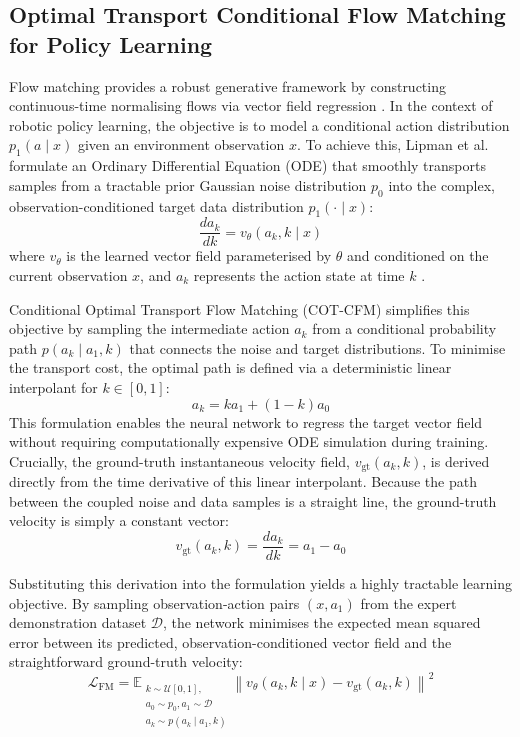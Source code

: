 \documentclass[journal]{IEEEtran}
\begin{document}
\subsection{Optimal Transport Conditional Flow Matching for Policy Learning} \label{sec:ot_cfm}

Flow matching provides a robust generative framework by constructing continuous-time normalising flows via vector field regression \cite{lipman2022flow}. In the context of robotic policy learning, the objective is to model a conditional action distribution $p_1(a \mid x)$ given an environment observation $x$. To achieve this, Lipman et al. \cite{lipman2022flow} formulate an Ordinary Differential Equation (ODE) that smoothly transports samples from a tractable prior Gaussian noise distribution $p_0$ into the complex, observation-conditioned target data distribution $p_1(\cdot \mid x)$:
\begin{equation}
    \frac{da_k}{dk} = v_\theta(a_k, k \mid x)
\end{equation}
where $v_\theta$ is the learned vector field parameterised by $\theta$ and conditioned on the current observation $x$, and $a_k$ represents the action state at time $k$ \cite{lipman2022flow}. 

Conditional Optimal Transport Flow Matching (COT-CFM) simplifies this objective by sampling the intermediate action $a_k$ from a conditional probability path $p(a_k \mid a_1, k)$ that connects the noise and target distributions. To minimise the transport cost, the optimal path is defined via a deterministic linear interpolant for $k \in [0, 1]$:
\begin{equation}
    a_k = k a_1 + (1 - k) a_0
\end{equation}
This formulation enables the neural network to regress the target vector field without requiring computationally expensive ODE simulation during training. Crucially, the ground-truth instantaneous velocity field, $v_{\text{gt}}(a_k, k)$, is derived directly from the time derivative of this linear interpolant. Because the path between the coupled noise and data samples is a straight line, the ground-truth velocity is simply a constant vector:
\begin{equation}
    v_{\text{gt}}(a_k, k) = \frac{da_k}{dk} = a_1 - a_0
\end{equation}

Substituting this derivation into the formulation yields a highly tractable learning objective. By sampling observation-action pairs $(x, a_1)$ from the expert demonstration dataset $\mathcal{D}$, the network minimises the expected mean squared error between its predicted, observation-conditioned vector field and the straightforward ground-truth velocity:
\begin{equation}
    \mathcal{L}_{\text{FM}} = \mathbb{E}_{\substack{k \sim \mathcal{U}[0,1], \\ a_0 \sim p_0, a_1 \sim \mathcal{D}\\ a_k \sim p(a_k \mid a_1, k)}} \left\| v_\theta(a_k, k \mid x) - v_{\text{gt}}(a_k, k) \right\|^2
\end{equation}
\end{document}
